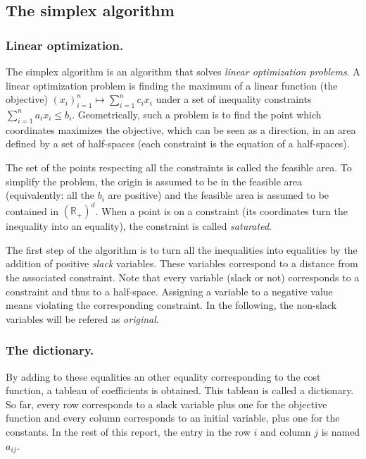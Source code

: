 \subsection{The simplex algorithm}

\subsubsection{Linear optimization.}
The simplex algorithm is an algorithm that solves \emph{linear optimization problems}. A linear optimization problem is finding the maximum of a linear function (the objective) $(x_i)_{i=1}^n \mapsto \sum_{i=1}^n c_i x_i$  under a set of inequality constraints $\sum_{i=1}^n a_i x_i \leq b_i$. Geometrically, such a problem is to find the point which coordinates maximizes the objective, which can be seen as a direction, in an area defined by a set of half-spaces (each constraint is the equation of a half-spaces).

The set of the points respecting all the constraints is called the feasible area. To simplify the problem, the origin is assumed to be in the feasible area (equivalently: all the $b_i$ are positive) and the feasible area is assumed to be contained in $(\mathbb{R}_+)^d$. When a point is on a constraint (its coordinates turn the inequality into an equality), the constraint is called \emph{saturated}. 

The first step of the algorithm is to turn all the inequalities into equalities by the addition of positive \emph{slack} variables. These variables correspond to a distance from the associated constraint. Note that every variable (slack or not) corresponds to a constraint and thus to a half-space. Assigning a variable to a negative value means violating the corresponding constraint. In the following, the non-slack variables will be refered as \emph{original}.

\subsubsection{The dictionary.}
By adding to these equalities an other equality corresponding to the cost function, a tableau of coefficients is obtained. This tableau is called a dictionary. So far, every row corresponds to a slack variable plus one for the objective function and every column corresponds to an initial variable, plus one for the constants. In the rest of this report, the entry in the row $i$ and column $j$ is named $a_{ij}$.


